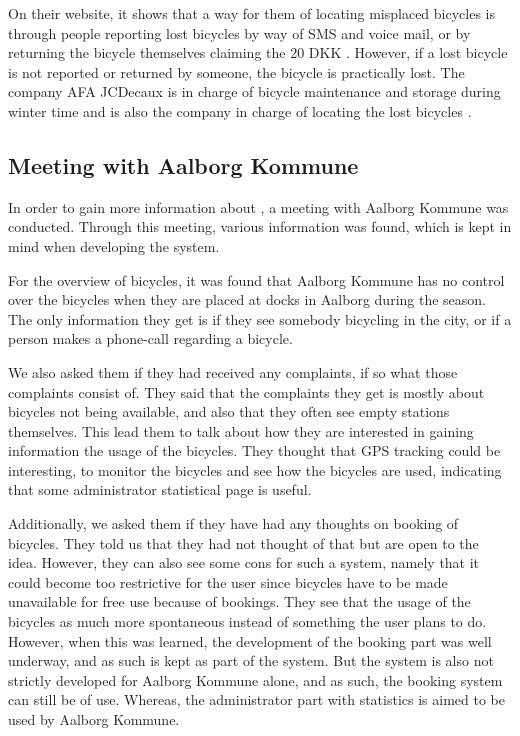 On their website, it shows that a way for them of locating misplaced bicycles is through people reporting lost bicycles by way of SMS and voice mail, or by returning the bicycle themselves claiming the 20 DKK \citep{misc:aalborgbycykelmangler}.
However, if a lost bicycle is not reported or returned by someone, the bicycle is practically lost.
The company AFA JCDecaux is in charge of bicycle maintenance and storage during winter time and is also the company in charge of locating the lost bicycles \citep{misc:aalborgcykling}.

\subsection{Meeting with Aalborg Kommune}\label{subsec:meetingaalborg}
In order to gain more information about \bycykelwithoutspace, a meeting with Aalborg Kommune was conducted. 
Through this meeting, various information was found, which is kept in mind when developing the system.

For the overview of bicycles, it was found that Aalborg Kommune has no control over the bicycles when they are placed at docks in Aalborg during the season.
The only information they get is if they see somebody bicycling in the city, or if a person makes a phone-call regarding a bicycle.

We also asked them if they had received any complaints, if so what those complaints consist of.
They said that the complaints they get is mostly about bicycles not being available, and also that they often see empty stations themselves.
This lead them to talk about how they are interested in gaining information the usage of the bicycles.
They thought that GPS tracking could be interesting, to monitor the bicycles and see how the bicycles are used, indicating that some administrator statistical page is useful.

Additionally, we asked them if they have had any thoughts on booking of bicycles.
They told us that they had not thought of that but are open to the idea.
However, they can also see some cons for such a system, namely that it could become too restrictive for the user since bicycles have to be made unavailable for free use because of bookings.
They see that the usage of the bicycles as much more spontaneous instead of something the user plans to do.
However, when this was learned, the development of the booking part was well underway, and as such is kept as part of the system.
But the system is also not strictly developed for Aalborg Kommune alone, and as such, the booking system can still be of use.
Whereas, the administrator part with statistics is aimed to be used by Aalborg Kommune.

